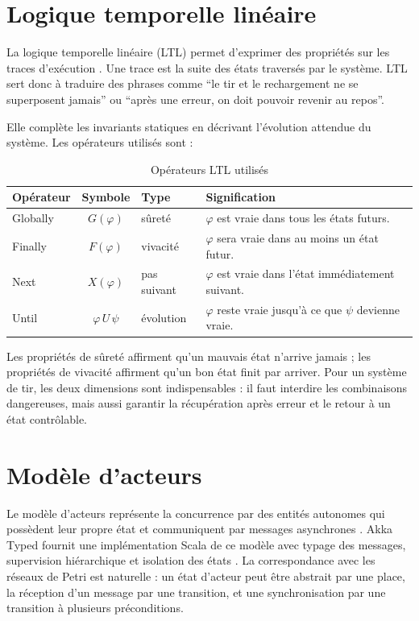 \documentclass[11pt,a4paper]{report}
\begin{document}
\section{Logique temporelle linéaire}
La logique temporelle linéaire (LTL) permet d'exprimer des propriétés sur les traces d'exécution \citep{pnueli1977}. Une trace est la suite des états traversés par le système. LTL sert donc à traduire des phrases comme ``le tir et le rechargement ne se superposent jamais'' ou ``après une erreur, on doit pouvoir revenir au repos''.

Elle complète les invariants statiques en décrivant l'évolution attendue du système. Les opérateurs utilisés sont :

\begin{table}[H]
\centering
\caption{Opérateurs LTL utilisés}
\begin{tabularx}{\textwidth}{lclY}
\toprule
Opérateur & Symbole & Type & Signification \\
\midrule
Globally & $G(\varphi)$ & sûreté & $\varphi$ est vraie dans tous les états futurs. \\
Finally & $F(\varphi)$ & vivacité & $\varphi$ sera vraie dans au moins un état futur. \\
Next & $X(\varphi)$ & pas suivant & $\varphi$ est vraie dans l'état immédiatement suivant. \\
Until & $\varphi\,U\,\psi$ & évolution & $\varphi$ reste vraie jusqu'à ce que $\psi$ devienne vraie. \\
\bottomrule
\end{tabularx}
\end{table}

Les propriétés de sûreté affirment qu'un mauvais état n'arrive jamais ; les propriétés de vivacité affirment qu'un bon état finit par arriver. Pour un système de tir, les deux dimensions sont indispensables : il faut interdire les combinaisons dangereuses, mais aussi garantir la récupération après erreur et le retour à un état contrôlable.

\section{Modèle d'acteurs}
Le modèle d'acteurs représente la concurrence par des entités autonomes qui possèdent leur propre état et communiquent par messages asynchrones \citep{hewitt1973,agha1986}. Akka Typed fournit une implémentation Scala de ce modèle avec typage des messages, supervision hiérarchique et isolation des états \citep{akka2024}. La correspondance avec les réseaux de Petri est naturelle : un état d'acteur peut être abstrait par une place, la réception d'un message par une transition, et une synchronisation par une transition à plusieurs préconditions.
\end{document}
